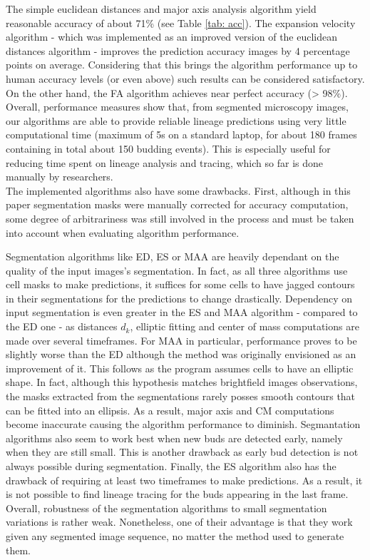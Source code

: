 \documentclass{TP}
\begin{document}
The simple euclidean distances and major axis analysis algorithm yield reasonable accuracy of about 71\% (see Table \ref{tab: acc}). The expansion velocity algorithm - which was implemented as an improved version of the euclidean distances algorithm - improves the prediction accuracy images by  4 percentage points on average. Considering that this brings the algorithm performance up to human accuracy levels (or even above) such results can be considered satisfactory. On the other hand, the FA algorithm achieves near perfect accuracy (> 98\%). Overall, performance measures show that, from segmented microscopy images, our algorithms are able to provide  reliable lineage predictions using very little computational time (maximum of 5s on a standard laptop, for about 180 frames containing in total about 150 budding events). This is especially useful for reducing time spent on lineage analysis and tracing, which so far is done manually by researchers. \\


The implemented algorithms also have some drawbacks. First, although in this paper segmentation masks were manually corrected for accuracy computation, some degree of arbitrariness was still involved in the process and must be taken into account when evaluating algorithm performance. 

Segmentation algorithms like ED, ES or MAA are heavily dependant on the quality of the input images's segmentation. In fact, as all three algorithms  use cell masks to make predictions, it suffices for some cells to have jagged contours in their segmentations for the predictions to change drastically. Dependency on input segmentation is even greater in the ES and MAA algorithm - compared to the ED one - as distances $d_k$, elliptic fitting and center of mass computations are made over several timeframes. For MAA in particular, performance proves to be slightly worse than the ED although the method was originally envisioned as an improvement of it. This follows as the program assumes cells to have an elliptic shape. In fact, although this hypothesis matches brightfield images observations, the masks extracted from the segmentations rarely posses smooth contours that can be fitted into an ellipsis. As a result, major axis and CM computations become inaccurate causing the algorithm performance to diminish. Segmantation algorithms  also seem to work best when new buds are detected early, namely when they are still small. This is another drawback as early bud detection is not always possible during segmentation. Finally, the ES algorithm also has the drawback of requiring at least two timeframes to make predictions. As a result, it is not possible to find lineage tracing for the buds appearing in the last frame. Overall, robustness of the segmentation algorithms to small segmentation variations is rather weak. Nonetheless, one of their advantage is that they work given any segmented image sequence, no matter the method used to generate them.
\end{document}
